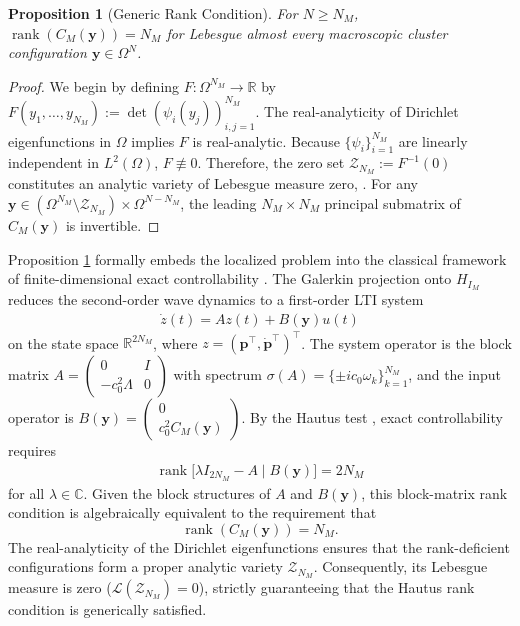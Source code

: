 \documentclass[11pt,a4paper]{article}
\numberwithin{equation}{section}
\newtheorem{proposition}[theorem]{Proposition}
\begin{document}
\begin{proposition}[Generic Rank Condition]
\label{prop:generic-rank-CM}
For $N \ge N_M$, $\operatorname{rank}(C_M(\mathbf{y})) = N_M$ for Lebesgue almost every macroscopic cluster configuration $\mathbf{y} \in \Omega^N$.
\end{proposition}
\begin{proof}
We begin by defining $F: \Omega^{N_M} \to \mathbb{R}$ by $F(y_1, \dots, y_{N_M}) := \det(\psi_i(y_j))_{i,j=1}^{N_M}$. The real-analyticity of Dirichlet eigenfunctions in $\Omega$ implies $F$ is real-analytic. Because $\{\psi_i\}_{i=1}^{N_M}$ are linearly independent in $L^2(\Omega)$, $F \not\equiv 0$. Therefore, the zero set $\mathcal{Z}_{N_M} := F^{-1}(0)$ constitutes an analytic variety of Lebesgue measure zero, \cite[Ch. 6, Th. 6.3.3]{krantz2002primer}. For any $\mathbf{y} \in (\Omega^{N_M} \setminus \mathcal{Z}_{N_M}) \times \Omega^{N-N_M}$, the leading $N_M \times N_M$ principal submatrix of $C_M(\mathbf{y})$ is invertible.
\end{proof}

\noindent
Proposition \ref{prop:generic-rank-CM} formally embeds the localized problem into the classical framework of finite-dimensional exact controllability \cite[Ch. 1]{TucsnakWeissBook}. The Galerkin projection onto $H_{I_M}$ reduces the second-order wave dynamics to a first-order LTI system \begin{align}
    \dot{z}(t) = Az(t) + B(\mathbf{y})u(t)
\end{align}
on the state space $\mathbb{R}^{2N_M}$, where $z = (\mathbf{p}^\top, \dot{\mathbf{p}}^\top)^\top$. The system operator is the block matrix $A = \left(\begin{smallmatrix} 0 & I \\ -c_0^2\Lambda & 0 \end{smallmatrix}\right)$ with spectrum $\sigma(A) = \{\pm i c_0\omega_k\}_{k=1}^{N_M}$, and the input operator is $B(\mathbf{y}) = \left(\begin{smallmatrix} 0 \\ c_0^2 C_M(\mathbf{y}) \end{smallmatrix}\right)$. By the Hautus test \cite[Sec. 1.5]{TucsnakWeissBook}, exact controllability requires 
\begin{align}
    \operatorname{rank}\Big[\lambda I_{2N_M} - A \mid B(\mathbf{y})\Big] = 2N_M
\end{align}
for all $\lambda \in \mathbb{C}$. Given the block structures of $A$ and $B(\mathbf{y})$, this block-matrix rank condition is algebraically equivalent to the requirement that $$\operatorname{rank}(C_M(\mathbf{y})) = N_M.$$ 
The real-analyticity of the Dirichlet eigenfunctions ensures that the rank-deficient configurations form a proper analytic variety $\mathcal{Z}_{N_M}$. Consequently, its Lebesgue measure is zero ($\mathcal{L}(\mathcal{Z}_{N_M}) = 0$), strictly guaranteeing that the Hautus rank condition is generically satisfied.
\bigskip
\end{document}
